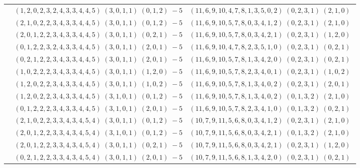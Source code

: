 \documentclass[11pt]{article}
\begin{document}
\begin{longtable}[l]{|c|c|c|}
 \cline{2-3} 
 & $(1 ,2 ,0 ,2 ,3 ,2 ,4 ,3 ,3 ,4 ,4 ,5) \;(3 ,0 ,1 ,1) \;(0 ,1 ,2) \;-5$ & $(11 ,6 ,9 ,10 ,4 ,7 ,8 ,1 ,3 ,5 ,0 ,2) \;(0 ,2 ,3 ,1) \;(2 ,1 ,0) \;$\\ 
 \cline{2-3} 
 & $(2 ,1 ,0 ,2 ,2 ,3 ,4 ,3 ,3 ,4 ,4 ,5) \;(3 ,0 ,1 ,1) \;(0 ,1 ,2) \;-5$ & $(11 ,6 ,9 ,10 ,5 ,7 ,8 ,0 ,3 ,4 ,1 ,2) \;(0 ,2 ,3 ,1) \;(2 ,1 ,0) \;$\\ 
 \cline{2-3} 
 & $(2 ,0 ,1 ,2 ,2 ,3 ,4 ,3 ,3 ,4 ,4 ,5) \;(3 ,0 ,1 ,1) \;(0 ,2 ,1) \;-5$ & $(11 ,6 ,9 ,10 ,5 ,7 ,8 ,0 ,3 ,4 ,2 ,1) \;(0 ,2 ,3 ,1) \;(1 ,2 ,0) \;$\\ 
 \cline{2-3} 
 & $(0 ,1 ,2 ,2 ,3 ,2 ,4 ,3 ,3 ,4 ,4 ,5) \;(3 ,0 ,1 ,1) \;(2 ,0 ,1) \;-5$ & $(11 ,6 ,9 ,10 ,4 ,7 ,8 ,2 ,3 ,5 ,1 ,0) \;(0 ,2 ,3 ,1) \;(0 ,2 ,1) \;$\\ 
 \cline{2-3} 
 & $(0 ,2 ,1 ,2 ,2 ,3 ,4 ,3 ,3 ,4 ,4 ,5) \;(3 ,0 ,1 ,1) \;(2 ,0 ,1) \;-5$ & $(11 ,6 ,9 ,10 ,5 ,7 ,8 ,1 ,3 ,4 ,2 ,0) \;(0 ,2 ,3 ,1) \;(0 ,2 ,1) \;$\\ 
 \cline{2-3} 
 & $(1 ,0 ,2 ,2 ,2 ,3 ,4 ,3 ,3 ,4 ,4 ,5) \;(3 ,0 ,1 ,1) \;(1 ,2 ,0) \;-5$ & $(11 ,6 ,9 ,10 ,5 ,7 ,8 ,2 ,3 ,4 ,0 ,1) \;(0 ,2 ,3 ,1) \;(1 ,0 ,2) \;$\\ 
 \cline{2-3} 
 & $(1 ,2 ,0 ,2 ,2 ,3 ,4 ,3 ,3 ,4 ,4 ,5) \;(3 ,0 ,1 ,1) \;(1 ,0 ,2) \;-5$ & $(11 ,6 ,9 ,10 ,5 ,7 ,8 ,1 ,3 ,4 ,0 ,2) \;(0 ,2 ,3 ,1) \;(2 ,0 ,1) \;$\\ 
 \cline{2-3} 
 & $(1 ,2 ,0 ,2 ,2 ,3 ,4 ,3 ,3 ,4 ,4 ,5) \;(3 ,1 ,0 ,1) \;(0 ,1 ,2) \;-5$ & $(11 ,6 ,9 ,10 ,5 ,7 ,8 ,1 ,3 ,4 ,0 ,2) \;(0 ,1 ,3 ,2) \;(2 ,1 ,0) \;$\\ 
 \cline{2-3} 
 & $(0 ,1 ,2 ,2 ,2 ,3 ,4 ,3 ,3 ,4 ,4 ,5) \;(3 ,1 ,0 ,1) \;(2 ,0 ,1) \;-5$ & $(11 ,6 ,9 ,10 ,5 ,7 ,8 ,2 ,3 ,4 ,1 ,0) \;(0 ,1 ,3 ,2) \;(0 ,2 ,1) \;$\\ 
 \cline{2-3} 
 & $(2 ,1 ,0 ,2 ,2 ,3 ,3 ,4 ,3 ,4 ,5 ,4) \;(3 ,0 ,1 ,1) \;(0 ,1 ,2) \;-5$ & $(10 ,7 ,9 ,11 ,5 ,6 ,8 ,0 ,3 ,4 ,1 ,2) \;(0 ,2 ,3 ,1) \;(2 ,1 ,0) \;$\\ 
 \cline{2-3} 
 & $(2 ,0 ,1 ,2 ,2 ,3 ,3 ,4 ,3 ,4 ,5 ,4) \;(3 ,1 ,0 ,1) \;(0 ,1 ,2) \;-5$ & $(10 ,7 ,9 ,11 ,5 ,6 ,8 ,0 ,3 ,4 ,2 ,1) \;(0 ,1 ,3 ,2) \;(2 ,1 ,0) \;$\\ 
 \cline{2-3} 
 & $(2 ,0 ,1 ,2 ,2 ,3 ,3 ,4 ,3 ,4 ,5 ,4) \;(3 ,0 ,1 ,1) \;(0 ,2 ,1) \;-5$ & $(10 ,7 ,9 ,11 ,5 ,6 ,8 ,0 ,3 ,4 ,2 ,1) \;(0 ,2 ,3 ,1) \;(1 ,2 ,0) \;$\\ 
 \cline{2-3} 
 & $(0 ,2 ,1 ,2 ,2 ,3 ,3 ,4 ,3 ,4 ,5 ,4) \;(3 ,0 ,1 ,1) \;(2 ,0 ,1) \;-5$ & $(10 ,7 ,9 ,11 ,5 ,6 ,8 ,1 ,3 ,4 ,2 ,0) \;(0 ,2 ,3 ,1) \;(0 ,2 ,1) \;$\\ 

\end{longtable}
\end{document}
